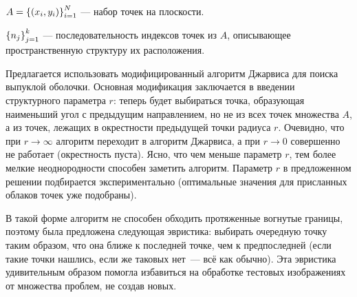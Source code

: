 






 $A = \left\{\left(x_i, y_i\right)\right\}_{i=1}^N$ --- набор точек на плоскости.

 $\left\{n_j\right\}_{j=1}^k$ --- последовательность индексов точек из $A$, описывающее пространственную структуру их расположения.

Предлагается использовать модифицированный алгоритм Джарвиса для поиска выпуклой оболочки. 
Основная модификация заключается в введении структурного параметра  $r$: теперь будет выбираться точка, образующая наименьший угол с предыдущим направлением, но не из всех точек множества $A$, а из точек, лежащих в окрестности предыдущей точки радиуса $r$. 
Очевидно, что при $r\to\infty$ алгоритм переходит в алгоритм Джарвиса, а при $r\to0$ совершенно не работает (окрестность пуста). 
Ясно, что чем меньше параметр $r$, тем более мелкие неоднородности способен заметить алгоритм.
Параметр $r$ в предложенном решении подбирается экспериментально (оптимальные значения для присланных облаков точек уже подобраны).

В такой форме алгоритм не способен обходить протяженные вогнутые границы, поэтому была предложена следующая эвристика: выбирать очередную точку таким образом, что она ближе к последней точке, чем к предпоследней (если такие точки нашлись, если же таковых нет~--- всё как обычно). 
Эта эвристика удивительным образом помогла избавиться на обработке тестовых изображениях от множества проблем, не создав новых.

